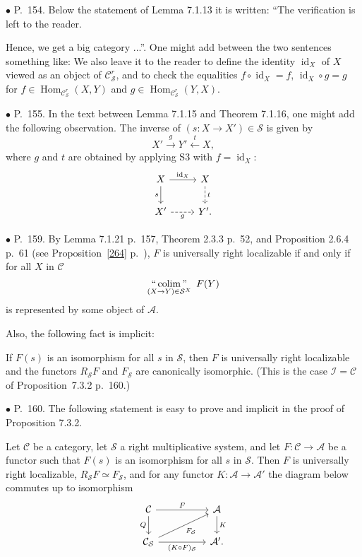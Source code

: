 \documentclass[12pt]{article}
\theoremstyle{remark}%
\newcommand{\bu}{\bullet}
\newcommand{\n}{\noindent}
\newcommand{\cc}{\mathcal}
\newcommand{\A}{\mathcal A}
\newcommand{\C}{\mathcal C}
\newcommand{\SSS}{\mathcal S}
\newcommand{\pr}{Proposition}
\DeclareMathOperator*{\coli}{colim}
\DeclareMathOperator*{\icolim}{``\coli"}
\DeclareMathOperator{\id}{id}
\DeclareMathOperator{\Hom}{Hom}
\begin{document}
\n$\bu$ P.~154. Below the statement of Lemma 7.1.13 it is written: ``The verification is left to the reader.

Hence, we get a big category ...''. One might add between the two sentences something like: We also leave it to the reader to define the identity $\id_X$ of $X$ viewed as an object of $\C^r_{\mathcal S}$, and to check the equalities $f\circ\id_X=f$, $\id_X\circ g=g$ for $f\in\Hom_{\C^r_{\mathcal S}}(X,Y)$ and $g\in\Hom_{\C^r_{\mathcal S}}(Y,X)$. 


\n$\bu$ P.~155. In the text between Lemma 7.1.15 and Theorem 7.1.16, one might add the following observation. The inverse of $(s:X\to X')\in\mathcal S$ is given by 
$$
X'\overset{g}{\to}Y'\overset{t}{\leftarrow}X,
$$
where $g$ and $t$ are obtained by applying S3 with $f=\id_X$:
$$
\begin{tikzcd}
X\ar{r}{\id_X}\ar{d}[swap]{s}&X\ar[dashed]{d}{t}\\ X'\ar[dashed]{r}[swap]{g}&Y'.
\end{tikzcd}
$$ 


\n$\bu$ P.~159. By Lemma 7.1.21 p.~157, Theorem 2.3.3 p.~52, and Proposition 2.6.4 p.~61 (see \pr\ \ref{264} p.~\pageref{264}), $F$ is universally right localizable if and only if for all $X$ in $\C$ 
$$
\icolim_{(X\to Y)\in\SSS^X}\ F(Y) 
$$
is represented by some object of $\A$. 

Also, the following fact is implicit:

If $F(s)$ is an isomorphism for all $s$ in $\cc S$, then $F$ is universally right localizable and the functors $R_{\cc S}F$ and $F_{\cc S}$ are canonically isomorphic. (This is the case $\cc I=\C$ of \pr\ 7.3.2 p.~160.)


\n$\bu$ P.~160. The following statement is easy to prove and implicit in the proof of Proposition 7.3.2. 

Let $\C$ be a category, let $\SSS$ a right multiplicative system, and let $F:\C\to\A$ be a functor such that $F(s)$ is an isomorphism for all $s$ in $\SSS$. Then $F$ is universally right localizable, $R_{\SSS}F\simeq F_{\SSS}$, and for any functor $K:\A\to\A'$ the diagram below commutes up to isomorphism
$$
\begin{tikzcd}
\C\ar{rr}{F}\ar{d}[swap]{Q}&&\A\ar{d}{K}\\
\C_{\SSS}\ar{rr}[swap]{(K\circ F)_{\SSS}}\ar{rru}[swap]{F_{\SSS}}&&\A'.
\end{tikzcd}
$$ 
\end{document}
